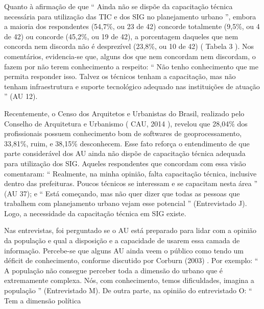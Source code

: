 \documentclass{article}
\begin{document}
Quanto à afirmação de que “%
Ainda não se dispõe da capacitação técnica
						necessária para utilização das TIC e dos SIG no planejamento
					urbano%
”, embora a maioria dos respondentes (54,7\%, ou 23 de 42)
					concorde totalmente (9,5\%, ou 4 de 42) ou concorde (45,2\%, ou 19 de 42), a
					porcentagem daqueles que nem concorda nem discorda não é desprezível (23,8\%, ou
					10 de 42) (%
Tabela 3%
). Nos comentários,
					evidencia-se que, alguns dos que nem concordam nem discordam, o fazem por não
					terem conhecimento a respeito: “%
Não tenho conhecimento que me permita
						responder isso. Talvez os técnicos tenham a capacitação, mas não tenham
						infraestrutura e suporte tecnológico adequado nas instituições de
						atuação%
” (AU 12).

Recentemente, o Censo dos Arquitetos e Urbanistas do Brasil, realizado pelo
					Conselho de Arquitetura e Urbanismo (%
CAU,
						2014%
), revelou que 28,04\% dos profissionais possuem conhecimento bom
					de %
softwares%
 de geoprocessamento, 33,81\%, ruim, e 38,15\%
					desconhecem. Esse fato reforça o entendimento de que parte considerável dos AU
					ainda não dispõe de capacitação técnica adequada para utilização dos SIG.
					Aqueles respondentes que concordam com essa visão comentaram:
						“%
Realmente, na minha opinião, falta capacitação técnica, inclusive
						dentro das prefeituras. Poucos técnicos se interessam e se capacitam nesta
						área%
” (AU 37); e “%
Está começando, mas não quer dizer que
						todas as pessoas que trabalhem com planejamento urbano vejam esse
						potencial%
” (Entrevistado J). Logo, a necessidade da capacitação
					técnica em SIG existe.

Nas entrevistas, foi perguntado se o AU está preparado para lidar com a opinião
					da população e qual a disposição e a capacidade de usarem essa camada de
					informação. Percebe-se que alguns AU ainda veem o público como tendo um déficit
					de conhecimento, conforme discutido por %
Corburn
						(2003)%
. Por exemplo: “%
A população não consegue perceber toda
						a dimensão do urbano que é extremamente complexa. Nós, com conhecimento,
						temos dificuldades, imagina a população%
” (Entrevistado M). De outra
					parte, na opinião do entrevistado O: “%
Tem a dimensão política%
\end{document}
